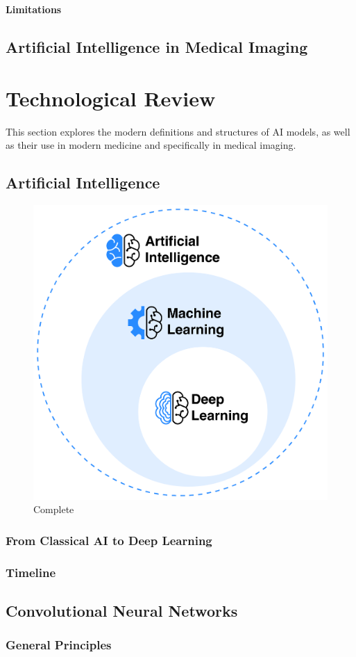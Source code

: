 \documentclass[a4paper,10pt]{book}
\begin{document}
\textbf{Limitations}




\section{Artificial Intelligence in Medical Imaging}

\chapter{Technological Review}

This section explores the modern definitions and structures of AI models, as well as their use in modern medicine and specifically in medical imaging.

\section{Artificial Intelligence}

\begin{figure}[h]
    \centering
    \includegraphics[width=0.5\linewidth]{reports//assets/ai.png}
    \caption[AI overview]{Complete}
    \label{fig:enter-label}
\end{figure}

\subsection{From Classical AI to Deep Learning}
\subsection{Timeline}

\section{Convolutional Neural Networks}
\subsection{General Principles}
\end{document}
